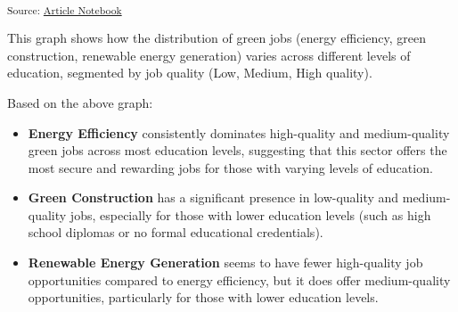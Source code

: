 \documentclass[
  letterpaper,
  DIV=11,
  numbers=noendperiod]{scrartcl}
\begin{document}
\textsubscript{Source:
\href{https://beeckcenter.github.io/climate-equity-workforce/index-preview.html}{Article
Notebook}}

This graph shows how the distribution of green jobs (energy efficiency,
green construction, renewable energy generation) varies across different
levels of education, segmented by job quality (Low, Medium, High
quality).

Based on the above graph:

\begin{itemize}
\item
  \textbf{Energy Efficiency} consistently dominates high-quality and
  medium-quality green jobs across most education levels, suggesting
  that this sector offers the most secure and rewarding jobs for those
  with varying levels of education.
\item
  \textbf{Green Construction} has a significant presence in low-quality
  and medium-quality jobs, especially for those with lower education
  levels (such as high school diplomas or no formal educational
  credentials).
\item
  \textbf{Renewable Energy Generation} seems to have fewer high-quality
  job opportunities compared to energy efficiency, but it does offer
  medium-quality opportunities, particularly for those with lower
  education levels.
\end{itemize}
\end{document}

